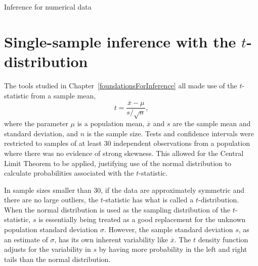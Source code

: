 \begin{chapterpage}{Inference for numerical data}
  \label{inferenceForNumericalData}
\end{chapterpage}
\renewcommand{\chapterfolder}{ch_inference_for_means_oi_biostat}



\section{Single-sample inference with the $t$-distribution}
\label{oneSampleMeansWithTDistribution}

\noindent%
The tools studied in Chapter~\ref{foundationsForInference} all made use of the $t$-statistic from a sample mean,
\[t = \frac{\overline{x} - \mu}{s/\sqrt{n}},\]
where the parameter $\mu$ is a population mean, $\overline{x}$ and $s$ are the sample mean and standard deviation, and $n$ is the sample size. Tests and confidence intervals were restricted to samples of at least 30 independent observations from a population where there was no evidence of strong skewness. This allowed for the Central Limit Theorem to be applied, justifying use of the normal distribution to calculate probabilities associated with the $t$-statistic. 

In sample sizes smaller than 30, if the data are approximately symmetric and there are no large outliers, the $t$-statistic has what is called a $t$-distribution. When the normal distribution is used as the sampling distribution of the $t$-statistic, $s$ is essentially being treated as a good replacement for the unknown population standard deviation $\sigma$. However, the sample standard deviation $s$, as an estimate of $\sigma$, has its own inherent variability like $\overline{x}$. The $t$ density function adjusts for the variability in $s$ by having more probability in the left and right tails than the normal distribution.

